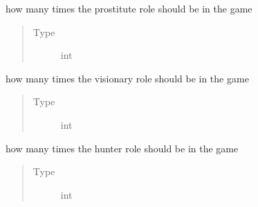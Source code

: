 \documentclass[letterpaper,10pt,english]{sphinxmanual}
\begin{document}
\begin{fulllineitems}

\begin{fulllineitems}
\label{\detokenize{chatwolf:chatwolf.game.Game.num_prostitute}}
how many times the prostitute role should be in the game
\begin{quote}\begin{description}
\item[{Type}] \leavevmode
int

\end{description}\end{quote}

\end{fulllineitems}


\begin{fulllineitems}
\label{\detokenize{chatwolf:chatwolf.game.Game.num_visionary}}
how many times the visionary role should be in the game
\begin{quote}\begin{description}
\item[{Type}] \leavevmode
int

\end{description}\end{quote}

\end{fulllineitems}


\begin{fulllineitems}
\label{\detokenize{chatwolf:chatwolf.game.Game.num_hunter}}
how many times the hunter role should be in the game
\begin{quote}\begin{description}
\item[{Type}] \leavevmode
int

\end{description}\end{quote}

\end{fulllineitems}


\end{fulllineitems}
\end{document}
